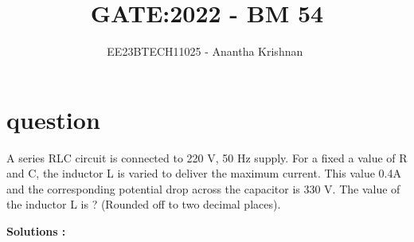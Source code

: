 \documentclass[journal,12pt,onecolumn]{IEEEtran}
\theoremstyle{remark}
\begin{document}

\vspace{3cm}

\title{GATE:2022 - BM 54 }
\author{EE23BTECH11025 - Anantha Krishnan $^{}$%
}
\maketitle
\bigskip



\section{question}

A series RLC circuit is connected to 220 V, 50 Hz supply. For a fixed a value of R and C, the inductor L is varied to deliver the maximum current. This value 0.4A and the corresponding potential drop across the capacitor is 330 V. The value of the inductor L is ? (Rounded off to two decimal places).
 



\textbf{Solutions :}
\fi







    
    \newcommand{\midlabelline}[3]{
   \node (midlabel) at ($ (#1)!.5!(#2) $) {#3};
   \draw[latex-] (#1) --  (midlabel);
   \draw[-latex] (midlabel) -- (#2);
}
\end{document}
